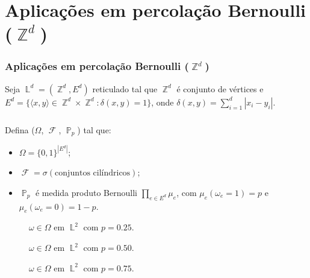 \documentclass[12pt]{beamer}
\theoremstyle{definition} %
\DeclareMathOperator{\PX}{\mathbb{P}} %
\DeclareMathOperator{\FX}{\mathcal{F}} %
\DeclareMathOperator{\ZX}{\mathbb{Z}} %
\DeclareMathOperator{\LX}{\mathbb{L}} %
\begin{document}
	\section{Aplicações em percolação Bernoulli ($\ZX^d$)}
	\begin{frame}[t]
		\frametitle{Aplicações em percolação Bernoulli ($\ZX^d$)}
		{\footnotesize Seja $\LX^d = (\ZX^d, E^d)$ reticulado tal que $\ZX^d$ é conjunto de vértices e $E^d = \{\langle x, y\rangle \in \ZX^d \times \ZX^d : \delta(x, y) = 1\}$, onde $\delta(x, y) = \sum_{i = 1}^{d} |x_i - y_i|$.} \\
		{\footnotesize $\phantom{X}$} \\
		\begin{minipage}{0.55 \textwidth}
			{\footnotesize Defina ($\Omega$, $\FX$, $\PX_p$) tal que:} 
			\begin{itemize}
				\item {\footnotesize $\Omega = \{0,1\}^{|E^d|}$;}
				\item {\footnotesize $\FX = \sigma(\text{conjuntos cilíndricos})$;}
				\item {\footnotesize $\PX_p$ é medida produto Bernoulli $\prod_{e \in E^d} \mu_e$, com $\mu_e(\omega_e = 1) = p$ e $\mu_e(\omega_e = 0) = 1-p$.}
			\end{itemize}	 
		\end{minipage}
		\pause
		\begin{minipage}{0.40 \textwidth}
			\begin{figure}
				\begin{overprint}
					\centering
					\centering
					\centering
				\end{overprint}
			\vspace{-12pt} 
				\begin{overprint}
					\caption{$\omega \in \Omega$ em $\LX^2$ com $p = 0.25$.}
					\caption{$\omega \in \Omega$ em $\LX^2$ com $p = 0.50$.}
					\caption{$\omega \in \Omega$ em $\LX^2$ com $p = 0.75$.}
				\end{overprint}
				\label{fig-reticulado}
			\end{figure}		
		\end{minipage}
	\end{frame}
\end{document}

